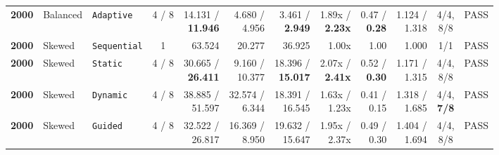 \documentclass[11pt,a4paper]{article}
\renewcommand{\_}{\textunderscore\allowbreak}
\begin{document}
\begin{table}[H]
{\begin{tabular}{r l l c r r r r r r c c}
\textbf{2000} & Balanced & \texttt{Adaptive} & 4 / 8 & \makecell[r]{14.131 /\\ \textbf{11.946}} & \makecell[r]{4.680 /\\ 4.956} & \makecell[r]{3.461 /\\ \textbf{2.949}} & \makecell[r]{1.89x /\\ \textbf{2.23x}} & \makecell[r]{0.47 /\\ \textbf{0.28}} & \makecell[r]{1.124 /\\ 1.318} & \makecell[c]{4/4,\\ 8/8} & PASS \\
\textbf{2000} & Skewed & \texttt{Sequential} & 1 & 63.524 & 20.277 & 36.925 & 1.00x & 1.00 & 1.000 & 1/1 & PASS \\
\textbf{2000} & Skewed & \texttt{Static} & 4 / 8 & \makecell[r]{30.665 /\\ \textbf{26.411}} & \makecell[r]{9.160 /\\ 10.377} & \makecell[r]{18.396 /\\ \textbf{15.017}} & \makecell[r]{2.07x /\\ \textbf{2.41x}} & \makecell[r]{0.52 /\\ \textbf{0.30}} & \makecell[r]{1.171 /\\ 1.315} & \makecell[c]{4/4,\\ 8/8} & PASS \\
\textbf{2000} & Skewed & \texttt{Dynamic} & 4 / 8 & \makecell[r]{38.885 /\\ 51.597} & \makecell[r]{32.574 /\\ 6.344} & \makecell[r]{18.391 /\\ 16.545} & \makecell[r]{1.63x /\\ 1.23x} & \makecell[r]{0.41 /\\ 0.15} & \makecell[r]{1.318 /\\ 1.685} & \makecell[c]{4/4,\\ \textbf{7/8}} & PASS \\
\textbf{2000} & Skewed & \texttt{Guided} & 4 / 8 & \makecell[r]{32.522 /\\ 26.817} & \makecell[r]{16.369 /\\ 8.950} & \makecell[r]{19.632 /\\ 15.647} & \makecell[r]{1.95x /\\ 2.37x} & \makecell[r]{0.49 /\\ 0.30} & \makecell[r]{1.404 /\\ 1.694} & \makecell[c]{4/4,\\ 8/8} & PASS \\

\end{tabular}}
\end{table}
\end{document}
